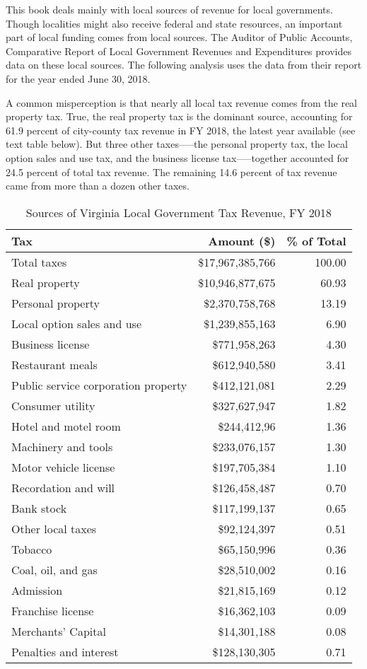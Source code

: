 \documentclass[
]{book}
\begin{document}
This book deals mainly with local sources of revenue for local governments. Though localities might also receive federal and state resources, an important part of local funding comes from local sources. The Auditor of Public Accounts, Comparative Report of Local Government Revenues and Expenditures provides data on these local sources. The following analysis uses the data from their report for the year ended June 30, 2018.

A common misperception is that nearly all local tax revenue comes from the real property tax. True, the real property tax is the dominant source, accounting for 61.9 percent of city-county tax revenue in FY 2018, the latest year available (see text table below). But three other taxes-----the personal property tax, the local option sales and use tax, and the business license tax-----together accounted for 24.5 percent of total tax revenue. The remaining 14.6 percent of tax revenue came from more than a dozen other taxes.

\begin{table}

\caption{\label{tab:unnamed-chunk-2}Sources of Virginia Local Government Tax Revenue, FY 2018}
\centering
\begin{tabular}[t]{l|r|r}
\hline
Tax & Amount (\$) & \% of Total\\
\hline
Total taxes & \$17,967,385,766 & 100.00\\
\hline
Real property & \$10,946,877,675 & 60.93\\
\hline
Personal property & \$2,370,758,768 & 13.19\\
\hline
Local option sales and use & \$1,239,855,163 & 6.90\\
\hline
Business license & \$771,958,263 & 4.30\\
\hline
Restaurant meals & \$612,940,580 & 3.41\\
\hline
Public service corporation property & \$412,121,081 & 2.29\\
\hline
Consumer utility & \$327,627,947 & 1.82\\
\hline
Hotel and motel room & \$244,412,96 & 1.36\\
\hline
Machinery and tools & \$233,076,157 & 1.30\\
\hline
Motor vehicle license & \$197,705,384 & 1.10\\
\hline
Recordation and will & \$126,458,487 & 0.70\\
\hline
Bank stock & \$117,199,137 & 0.65\\
\hline
Other local taxes & \$92,124,397 & 0.51\\
\hline
Tobacco & \$65,150,996 & 0.36\\
\hline
Coal, oil, and gas & \$28,510,002 & 0.16\\
\hline
Admission & \$21,815,169 & 0.12\\
\hline
Franchise license & \$16,362,103 & 0.09\\
\hline
Merchants' Capital & \$14,301,188 & 0.08\\
\hline
Penalties and interest & \$128,130,305 & 0.71\\
\hline
\end{tabular}
\end{table}
\end{document}
